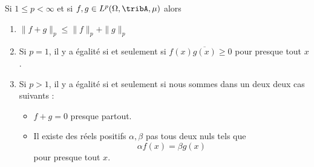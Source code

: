 \begin{proposition}     \label{PropInegMinkKUpRHg}
    Si \( 1\leq p<\infty\) et si \( f,g\in L^p(\Omega,\tribA,\mu)\) alors
    \begin{enumerate}
        \item   \label{ItemDHukLJi}
            \( \| f+g \|_p\leq \| f \|_p+\| g \|_p\)
        \item       \label{ITEMooGRXBooMLRMww}
            Si \( p=1\), il y a égalité si et seulement si \( f(x)\overline{ g(x) }\geq 0\) pour presque tout \( x\).
        \item       \label{ITEMooQCSHooNUDwtM}
            Si \( p>1\), il y a égalité si et seulement si nous sommes dans un deux deux cas suivants :
            \begin{itemize}
                \item
                    \( f+g=0\) presque partout.
                \item 
            Il existe des réels positifs \( \alpha,\beta\) pas tous deux nuls tels que
            \begin{equation}
                \alpha f(x)=\beta g(x)
            \end{equation}
            pour presque tout \( x\).
            \end{itemize}
    \end{enumerate}
\end{proposition}

